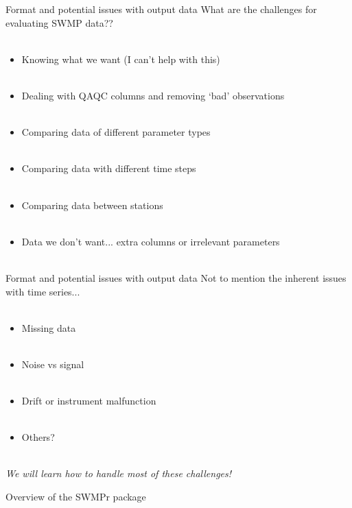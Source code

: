 \documentclass[xcolor=svgnames]{beamer}\usepackage[]{graphicx}\usepackage[]{color}
\begin{document}
\begin{frame}{Format and potential issues with output data}
\onslide<+->
What are the challenges for evaluating SWMP data?? \\~\\
\onslide<+->
\begin{itemize}
\item Knowing what we want (I can't help with this) \\~\\
\item Dealing with QAQC columns and removing `bad' observations \\~\\
\item Comparing data of different parameter types \\~\\
\item Comparing data with different time steps \\~\\
\item Comparing data between stations \\~\\
\item Data we don't want... extra columns or irrelevant parameters \\~\\
\end{itemize}
\end{frame}

\begin{frame}{Format and potential issues with output data}
\onslide<+->
Not to mention the inherent issues with time series... \\~\\
\begin{itemize}
\item Missing data \\~\\
\item Noise vs signal \\~\\
\item Drift or instrument malfunction \\~\\
\item Others?\\~\\
\end{itemize}
\onslide<+->
\centerline{\emph{We will learn how to handle most of these challenges!}}
\end{frame}

\begin{frame}{Overview of the SWMPr package}\

\end{frame}

\begin{frame}

\end{frame}

\begin{frame}

\end{frame}
\end{document}
